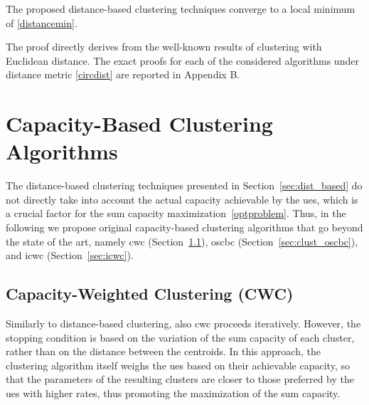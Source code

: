 \begin{theorem}\label{th_distancebased}
    The proposed distance-based clustering techniques converge to a local minimum of \eqref{distancemin}.
\end{theorem}
\begin{IEEEproof}[Proof] 
The proof directly derives from the well-known results of clustering with Euclidean distance. The exact proofs for each of the considered algorithms under distance metric \eqref{circdist} are reported in Appendix B.
\end{IEEEproof}

\section{Capacity-Based Clustering Algorithms}
\label{sec:cap_based}
The distance-based clustering techniques presented in Section~\ref{sec:dist_based} do not directly take into account the actual capacity achievable by the \glspl{ue}, which is a crucial factor for the sum capacity maximization~\eqref{optproblem}. Thus, in the following we propose original capacity-based clustering algorithms that go beyond the state of the art, namely \gls{cwc} (Section~\ref{sec:cwc}), \gls{oscbc} (Section~\ref{sec:clust_oscbc}), and \gls{icwc} (Section~\ref{sec:icwc}).

\subsection{Capacity-Weighted Clustering (CWC)}
\label{sec:cwc}

Similarly to distance-based clustering, also \gls{cwc} proceeds iteratively. However, the stopping condition is based on the variation of the sum capacity of each cluster, rather than on the distance between the centroids. 
In this approach, the clustering algorithm itself weighs the \glspl{ue} based on their achievable capacity, so that the parameters of the resulting clusters are closer to those preferred by the \glspl{ue} with higher rates, thus promoting the maximization of the sum capacity.

